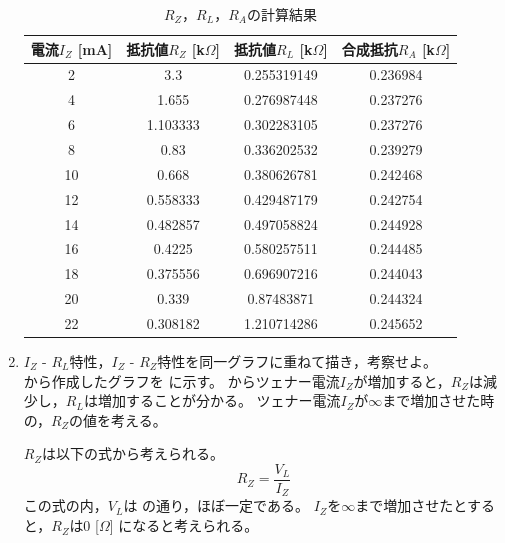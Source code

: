 \begin{enumerate}
		\begin{table}[hbt]
			\centering
			\caption{$R_Z$，$R_L$，$R_A$の計算結果}
			\begin{tabular}{|c|c|c|c|}
			\hline
			電流$I_Z$ [mA] & 抵抗値$R_Z$ [k$\Omega$] & 抵抗値$R_L$ [k$\Omega$] & 合成抵抗$R_A$ [k$\Omega$] \\ \hline
			2               & 3.3              & 0.255319149      & 0.236984         \\ \hline
			4               & 1.655            & 0.276987448      & 0.237276         \\ \hline
			6               & 1.103333         & 0.302283105      & 0.237276         \\ \hline
			8               & 0.83             & 0.336202532      & 0.239279         \\ \hline
			10              & 0.668            & 0.380626781      & 0.242468         \\ \hline
			12              & 0.558333         & 0.429487179      & 0.242754         \\ \hline
			14              & 0.482857         & 0.497058824      & 0.244928         \\ \hline
			16              & 0.4225           & 0.580257511      & 0.244485         \\ \hline
			18              & 0.375556         & 0.696907216      & 0.244043         \\ \hline
			20              & 0.339            & 0.87483871       & 0.244324         \\ \hline
			22              & 0.308182         & 1.210714286      & 0.245652         \\ \hline
			\end{tabular}
			\label{tab:resistance_calc1}
		\end{table}

		\item $I_Z$ - $R_L$特性，$I_Z$ - $R_Z$特性を同一グラフに重ねて描き，考察せよ。\\
  
		 から作成したグラフを に示す。
		 からツェナー電流$I_Z$が増加すると，$R_Z$は減少し，$R_L$は増加することが分かる。
		ツェナー電流$I_Z$が$\infty$まで増加させた時の，$R_Z$の値を考える。%

		$R_Z$は以下の式から考えられる。
		\begin{equation}
			R_Z = \frac{V_L}{I_Z} \nonumber
		\end{equation}
		この式の内，$V_L$は の通り，ほぼ一定である。
		$I_Z$を$\infty$まで増加させたとすると，$R_Z$は0 [$\Omega$] になると考えられる。


\end{enumerate}
